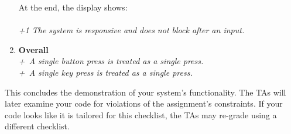 \begin{enumerate}
{        At the end, the display shows: \\
         \\
        \textit{+1 The system is responsive and does not block after an input.}}
    \item [] \textbf{Overall} \\
    \textit{+\textonehalf\ A single button press is treated as a single press.} \\
    \textit{+\textonehalf\ A single key press is treated as a single press.}
\end{enumerate}

This concludes the demonstration of your system's functionality.
The TAs will later examine your code for violations of the assignment's constraints.
If your code looks like it is tailored for this checklist, the TAs may re-grade using a different checklist.
